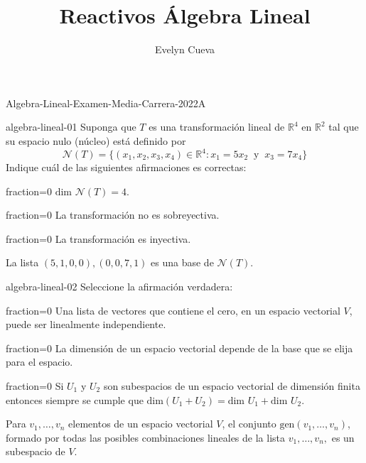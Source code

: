 \documentclass[10pt]{article}
\title{Reactivos Álgebra Lineal}
\author{Evelyn Cueva}
\begin{document}
\maketitle

\begin{quiz}{Algebra-Lineal-Examen-Media-Carrera-2022A}


\begin{multi}{algebra-lineal-01}
    Suponga que $T$ es una transformaci\'on lineal de $\mathbb{R}^4$ en $\mathbb{R}^2$ tal que su espacio nulo (n\'ucleo) est\'a definido por
    \[
        \mathcal N(T) = \lbrace (x_1,x_2,x_3,x_4)\in \mathbb R^4 \colon x_1 = 5x_2 \ \text{ y }\ x_3=7x_4\rbrace
    \]
    Indique cu\'al de las siguientes afirmaciones es correctas:
    \item[fraction=0] $\text{dim }\mathcal N(T) = 4.$
    \item[fraction=0] La transformaci\'on no es sobreyectiva.
    \item[fraction=0] La transformaci\'on es inyectiva.
    \item* La lista $(5,1,0,0), (0,0,7,1)$ es una base de $\mathcal N(T).$ 
\end{multi}


\begin{multi}{algebra-lineal-02}
    Seleccione la afirmaci\'on verdadera: 
    \item[fraction=0] Una lista de vectores que contiene el cero, en un espacio vectorial $V$, puede ser linealmente independiente. 
    \item[fraction=0] La dimensi\'on de un espacio vectorial depende de la base que se elija para el espacio.
    \item[fraction=0] Si $U_1$ y $U_2$ son subespacios de un espacio vectorial de dimensi\'on finita entonces siempre se cumple que $\text{dim}(U_1+
    U_2) = \text{dim }U_1 + \text{dim }U_2.$
    \item* Para $v_1,\ldots,v_n$ elementos de un espacio vectorial $V$, el conjunto $\text{gen}(v_1,\ldots,v_n)$, formado por todas las posibles combinaciones lineales de la lista $v_1,\ldots,v_n,$ es un subespacio de $V$. 
\end{multi}


\end{quiz}
\end{document}
